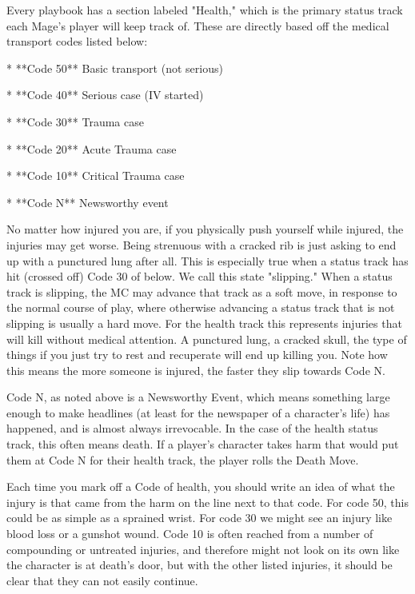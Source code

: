 \documentclass[
  oneside,
  statementpaper,
  9pt]{memoir}
\begin{document}
\begin{Narrator}

Every playbook has a section labeled "Health," which is the primary status track each Mage's player will keep track of. These are directly based off the medical transport codes listed below:

* **Code 50** Basic transport (not serious)

* **Code 40** Serious case (IV started)

* **Code 30** Trauma case

* **Code 20** Acute Trauma case

* **Code 10** Critical Trauma case

* **Code N** Newsworthy event

No matter how injured you are, if you physically push yourself while injured, the injuries may get worse. Being strenuous with a cracked rib is just asking to end up with a punctured lung after all. This is especially true when a status track has hit (crossed off) Code 30 of below. We call this state "slipping." When a status track is slipping, the MC may advance that track as a soft move, in response to the normal course of play, where otherwise advancing a status track that is not slipping is usually a hard move. For the health track this represents injuries that will kill without medical attention. A punctured lung, a cracked skull, the type of things if you just try to rest and recuperate will end up killing you. Note how this means the more someone is injured, the faster they slip towards Code N.

Code N, as noted above is a Newsworthy Event, which means something large enough to make headlines (at least for the newspaper of a character’s life) has happened, and is almost always irrevocable. In the case of the health status track, this often means death. If a player's character takes harm that would put them at Code N for their health track, the player rolls the Death Move. 

\end{Narrator}

\begin{Player}

Each time you mark off a Code of health, you should write an idea of what the injury is that came from the harm on the line next to that code. For code 50, this could be as simple as a sprained wrist. For code 30 we might see an injury like blood loss or a gunshot wound.  Code 10 is often reached from a number of compounding or untreated injuries, and therefore might not look on its own like the character is at death’s door, but with the other listed injuries, it should be clear that they can not easily continue.

\end{Player}
\end{document}
